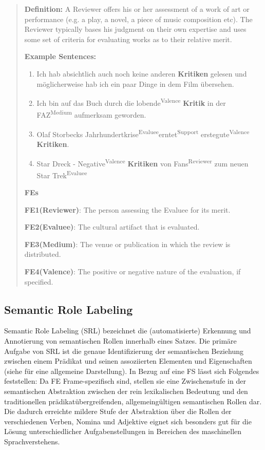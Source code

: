 \documentclass[12pt]{article}
\begin{document}
\begin{quote}
\textbf{Definition:}
A Reviewer offers his or her assessment of a work of art or performance (e.g. a play, a novel, a piece of music composition etc). The Reviewer typically bases his judgment on their own expertise and uses some set of criteria for evaluating works as to their relative merit.

\textbf{Example Sentences:}
\begin{enumerate}
\item Ich hab absichtlich auch noch keine anderen \textbf{Kritiken} gelesen und möglicherweise hab ich ein paar Dinge in dem Film übersehen.
\item Ich bin auf das Buch durch die \lbrack lobende\rbrack \textsuperscript{Valence} \textbf{Kritik} \lbrack in der FAZ\rbrack \textsuperscript{Medium} aufmerksam geworden.
\item \lbrack Olaf Storbecks Jahrhundertkrise\rbrack\textsuperscript{Evaluee}\lbrack erntet\rbrack\textsuperscript{Support} erste\lbrack gute\rbrack \textsuperscript{Valence} \textbf{Kritiken}.
\item Star Dreck - \lbrack Negative\rbrack \textsuperscript{Valence} \textbf{Kritiken} \lbrack von Fans\rbrack \textsuperscript{Reviewer}  \lbrack zum neuen Star Trek\rbrack \textsuperscript{Evaluee}
\end{enumerate}


\textbf{FEs}

\textbf{FE1(Reviewer)}: The person assessing the Evaluee for its merit.

\textbf{FE2(Evaluee)}: The cultural artifact that is evaluated.

\textbf{FE3(Medium)}: The venue or publication in which the review is distributed.

\textbf{FE4(Valence)}: The positive or negative nature of the evaluation, if specified. 
\end{quote}

\subsection{Semantic Role Labeling}\label{subsec:introduction_SRL}

Semantic Role Labeling (SRL) bezeichnet die (automatisierte) Erkennung und
Annotierung von semantischen Rollen innerhalb eines Satzes. Die primäre
Aufgabe von SRL ist die genaue Identifizierung der semantischen Beziehung
zwischen einem Prädikat und seinen assoziierten Elementen und Eigenschaften
(siehe \cite{SRL2008} für eine allgemeine Darstellung). In Bezug auf eine FS lässt
sich Folgendes feststellen: Da FE Frame-spezifisch sind, stellen sie eine
Zwischenstufe in der semantischen Abstraktion zwischen der rein lexikalischen
Bedeutung und den traditionellen prädikatübergreifenden, allgemeingültigen semantischen Rollen dar.
Die dadurch erreichte \glqq{}mildere\grqq{} Stufe der Abstraktion über die
Rollen der verschiedenen Verben, Nomina und Adjektive eignet sich besonders gut
für die Lösung unterschiedlicher Aufgabenstellungen in Bereichen des maschinellen 
Sprachverstehens.
\end{document}
